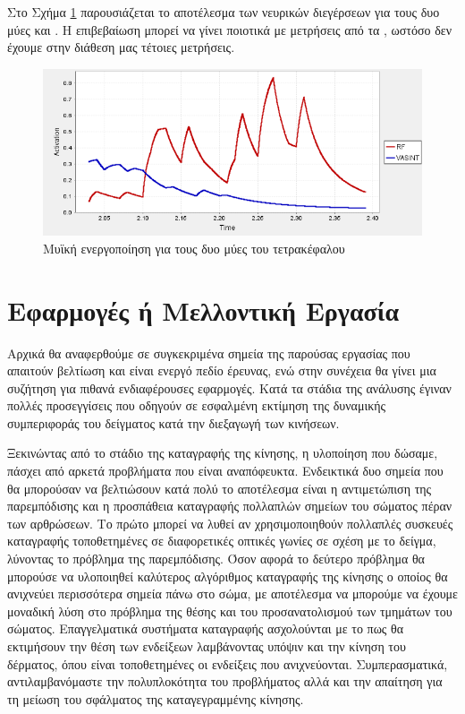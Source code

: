 Στο Σχήμα \ref{fig:rf-vasint-activation} παρουσιάζεται το αποτέλεσμα των νευρικών διεγέρσεων για τους δυο μύες  και . Η επιβεβαίωση μπορεί να γίνει ποιοτικά με μετρήσεις από τα , ωστόσο δεν έχουμε στην διάθεση μας τέτοιες μετρήσεις.

\begin{figure}[H]
    \centering
    \includegraphics[width=0.8\linewidth, keepaspectratio]{fig/rf-vasint-activation.png}
    \caption{Μυϊκή ενεργοποίηση για τους δυο μύες του τετρακέφαλου}
    \label{fig:rf-vasint-activation}
\end{figure}

\section{Εφαρμογές ή Μελλοντική Εργασία}

Αρχικά θα αναφερθούμε σε συγκεκριμένα σημεία της παρούσας εργασίας που απαιτούν βελτίωση και είναι ενεργό πεδίο έρευνας, ενώ στην συνέχεια θα γίνει μια συζήτηση για πιθανά ενδιαφέρουσες εφαρμογές. Κατά τα στάδια της ανάλυσης έγιναν πολλές προσεγγίσεις που οδηγούν σε εσφαλμένη εκτίμηση της δυναμικής συμπεριφοράς του δείγματος κατά την διεξαγωγή των κινήσεων.

Ξεκινώντας από το στάδιο της καταγραφής της κίνησης, η υλοποίηση που δώσαμε, πάσχει από αρκετά προβλήματα που είναι αναπόφευκτα. Ενδεικτικά δυο σημεία που θα μπορούσαν να βελτιώσουν κατά πολύ το αποτέλεσμα είναι η αντιμετώπιση της παρεμπόδισης και η προσπάθεια καταγραφής πολλαπλών σημείων του σώματος πέραν των αρθρώσεων. Το πρώτο μπορεί να λυθεί αν χρησιμοποιηθούν πολλαπλές συσκευές καταγραφής τοποθετημένες σε διαφορετικές οπτικές γωνίες σε σχέση με το δείγμα, λύνοντας το πρόβλημα της παρεμπόδισης. Όσον αφορά το δεύτερο πρόβλημα θα μπορούσε να υλοποιηθεί καλύτερος αλγόριθμος καταγραφής της κίνησης ο οποίος θα ανιχνεύει περισσότερα σημεία πάνω στο σώμα, με αποτέλεσμα να μπορούμε να έχουμε μοναδική λύση στο πρόβλημα της θέσης και του προσανατολισμού των τμημάτων του σώματος. Επαγγελματικά συστήματα καταγραφής ασχολούνται με το πως θα εκτιμήσουν την θέση των ενδείξεων λαμβάνοντας υπόψιν και την κίνηση του δέρματος, όπου είναι τοποθετημένες οι ενδείξεις που ανιχνεύονται. Συμπερασματικά, αντιλαμβανόμαστε την πολυπλοκότητα του προβλήματος αλλά και την απαίτηση για τη μείωση του σφάλματος της καταγεγραμμένης κίνησης.

